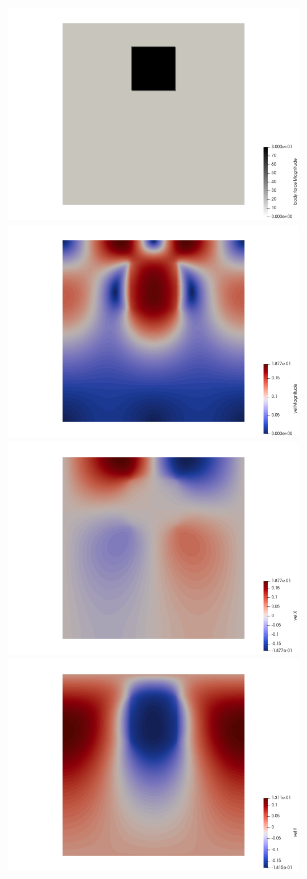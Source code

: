 \begin{center}
\includegraphics[width=7.7cm]{python_codes/fieldstone_80/results/block/rhog}
\includegraphics[width=7.7cm]{python_codes/fieldstone_80/results/block/vel}\\
\includegraphics[width=7.7cm]{python_codes/fieldstone_80/results/block/u}
\includegraphics[width=7.7cm]{python_codes/fieldstone_80/results/block/v}\\

\end{center}
